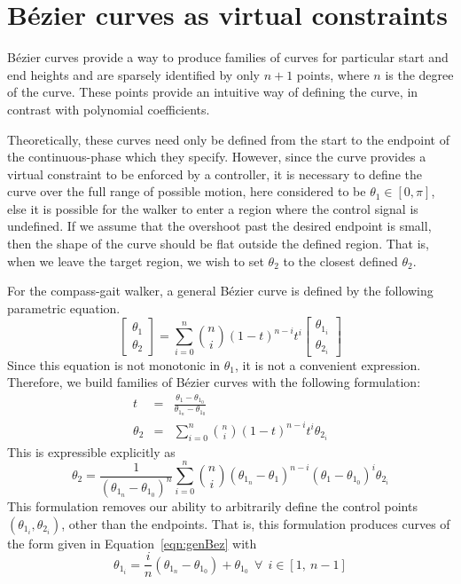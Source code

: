 \section{B{\'e}zier curves as virtual constraints}
Bézier curves provide a way to produce families of curves for particular start and end heights and are sparsely identified by only $n+1$ points, where $n$ is the degree of the curve. These points provide an intuitive way of defining the curve, in contrast with polynomial coefficients.
\par

Theoretically, these curves need only be defined from the start to the endpoint of the continuous-phase which they specify. However, since the curve provides a virtual constraint to be enforced by a controller, it is necessary to define the curve over the full range of possible motion, here considered to be $\theta_1 \in \left[0, \pi\right]$, else it is possible for the walker to enter a region where the control signal is undefined. If we assume that the overshoot past the desired endpoint is small, then the shape of the curve should be flat outside the defined region. That is, when we leave the target region, we wish to set $\theta_2$ to the closest defined $\theta_2$. \\ \par

For the compass-gait walker, a general Bézier curve is defined by the following parametric equation.
\begin{equation}
	\begin{bmatrix}
		\theta_1 \\ \theta_2
	\end{bmatrix}
	=
	\sum_{i=0}^{n}\binom{n}{i}\left(1-t\right)^{n-i}t^i
	\begin{bmatrix}
		\theta_{1_i} \\ \theta_{2_i}
	\end{bmatrix} \label{eqn:genBez}
\end{equation}
Since this equation is not monotonic in $\theta_1$, it is not a convenient expression. Therefore, we build families of Bézier curves with the following formulation:
\begin{eqnarray}
	t &=& \frac{\theta_1 - \theta_{1_0}}{\theta_{1_n} - \theta_{1_0}} \\
	\theta_2 &=& \sum_{i=0}^{n}\binom{n}{i}\left(1-t\right)^{n-i}t^i\theta_{2_i}
\end{eqnarray}
This is expressible explicitly as
\begin{equation}
	\theta_2 = \frac{1}{\left(\theta_{1_n} - \theta_{1_0}\right)^n}\sum_{i=0}^{n}\binom{n}{i}
		\left(\theta_{1_n} - \theta_1\right)^{n-i}
		\left(\theta_1 - \theta_{1_0}\right)^i\theta_{2_i} \label{eqn:expBez}
\end{equation}
This formulation removes our ability to arbitrarily define the control points $\left(\theta_{1_i}, \theta_{2_i}\right)$, other than the endpoints. That is, this formulation produces curves of the form given in Equation~\ref{eqn:genBez} with
\begin{equation}
	\theta_{1_i} = \frac{i}{n}\left(\theta_{1_n}-\theta_{1_0}\right) + \theta_{1_0} ~~
	\forall ~~ i \in \left[1,~n-1\right]
\end{equation}

